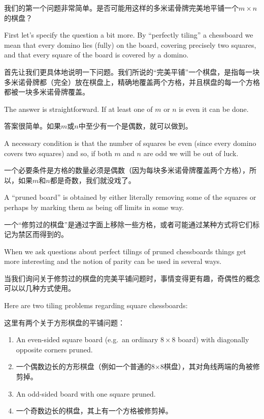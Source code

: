 我们的第一个问题非常简单。是否可能用这样的多米诺骨牌完美地平铺一个$m \times n$的棋盘？

First let's specify the question a bit more.  By ``perfectly tiling''
a chessboard we mean that every domino lies (fully) on the board,
covering precisely two squares, and that every square of the board 
is covered by a domino.

首先让我们更具体地说明一下问题。我们所说的“完美平铺”一个棋盘，是指每一块多米诺骨牌都（完全）放在棋盘上，精确地覆盖两个方格，并且棋盘的每一个方格都被一块多米诺骨牌覆盖。

The answer is straightforward.  If at least one of $m$ or $n$ is even
it can be done.

答案很简单。如果$m$或$n$中至少有一个是偶数，就可以做到。

A necessary condition is that the number of squares
be even (since every domino covers two squares) and so, if both $m$ 
and $n$ are odd we will be out of luck.

一个必要条件是方格的数量必须是偶数（因为每块多米诺骨牌覆盖两个方格），所以，如果$m$和$n$都是奇数，我们就没戏了。

A ``pruned board'' is obtained by either literally removing some of the
squares or perhaps by marking them as being off limits in some way.

一个“修剪过的棋盘”是通过字面上移除一些方格，或者可能通过某种方式将它们标记为禁区而得到的。

When we ask questions about perfect tilings of pruned chessboards things
get more interesting and the notion of parity can be used in several
ways.

当我们询问关于修剪过的棋盘的完美平铺问题时，事情变得更有趣，奇偶性的概念可以以几种方式使用。

Here are two tiling problems regarding square chessboards:

这里有两个关于方形棋盘的平铺问题：

\begin{enumerate}
\item An even-sided square board (e.g.\ an ordinary $8 \times 8$ board) 
with diagonally opposite corners pruned.
\item 一个偶数边长的方形棋盘（例如一个普通的8×8棋盘），其对角线两端的角被修剪掉。
\item An odd-sided board with one square pruned.
\item 一个奇数边长的棋盘，其上有一个方格被修剪掉。
\end{enumerate} 

